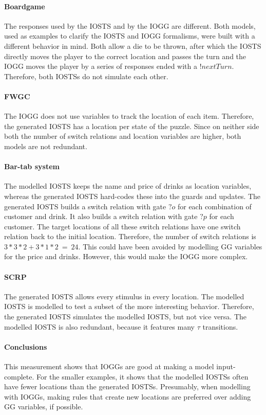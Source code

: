 \paragraph*{Boardgame}
The responses used by the IOSTS and by the IOGG are different. Both models, used as examples to clarify the IOSTS and IOGG formalisms, were built with a different behavior in mind. Both allow a die to be thrown, after which the IOSTS directly moves the player to the correct location and passes the turn and the IOGG moves the player by a series of responses ended with a $!nextTurn$. Therefore, both IOSTSs do not simulate each other.

\paragraph*{FWGC}
The IOGG does not use variables to track the location of each item. Therefore, the generated IOSTS has a location per state of the puzzle. Since on neither side both the number of switch relations and location variables are higher, both models are not redundant.

\paragraph*{Bar-tab system}
The modelled IOSTS keeps the name and price of drinks as location variables, whereas the generated IOSTS hard-codes these into the guards and updates. The generated IOSTS builds a switch relation with gate $?o$ for each combination of customer and drink. It also builds a switch relation with gate $?p$ for each customer. The target locations of all these switch relations have one switch relation back to the initial location. Therefore, the number of switch relations is $3*3*2+3*1*2\: =\: 24$. This could have been avoided by modelling GG variables for the price and drinks. However, this would make the IOGG more complex. 

\paragraph*{SCRP}
The generated IOSTS allows every stimulus in every location. The modelled IOSTS is modelled to test a subset of the more interesting behavior. Therefore, the generated IOSTS simulates the modelled IOSTS, but not vice versa. The modelled IOSTS is also redundant, because it features many $\tau$ transitions.

\paragraph*{Conclusions}
This measurement shows that IOGGs are good at making a model input-complete. For the smaller examples, it shows that the modelled IOSTSs often have fewer locations than the generated IOSTSs. Presumably, when modelling with IOGGs, making rules that create new locations are preferred over adding GG variables, if possible.

